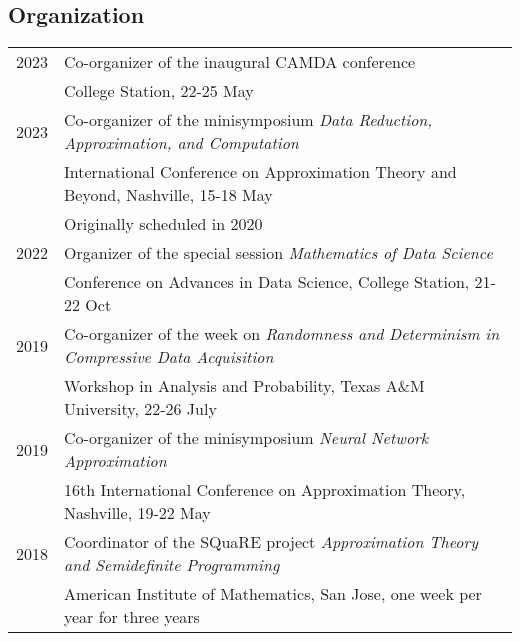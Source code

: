 \documentclass[11pt]{article}
\begin{document}
\subsection{Organization}

\begin{tabular}{ll}
2023\phantom{-??} & Co-organizer of the inaugural CAMDA conference\\
& College Station, 22-25 May\\
2023 & Co-organizer of the minisymposium {\sl Data Reduction, Approximation, and Computation}\\
& International Conference on Approximation Theory and Beyond, Nashville,  15-18 May\\
& {\small Originally scheduled in 2020}\\
2022 & Organizer of the special session {\em Mathematics of Data Science}\\
& Conference on Advances in Data Science, College Station, 21-22 Oct\\
2019 & Co-organizer of the week on {\sl Randomness and Determinism in Compressive Data Acquisition}\\
& Workshop in Analysis and Probability, Texas A\&M University,  22-26 July\\
2019 & Co-organizer of the minisymposium {\sl Neural Network Approximation}\\
& 16th International Conference on Approximation Theory, Nashville, 19-22 May\\
2018 & Coordinator of the SQuaRE project {\sl Approximation Theory and Semidefinite Programming}\\
& American Institute of Mathematics, San Jose, one week per year for three years
\end{tabular}
\end{document}
